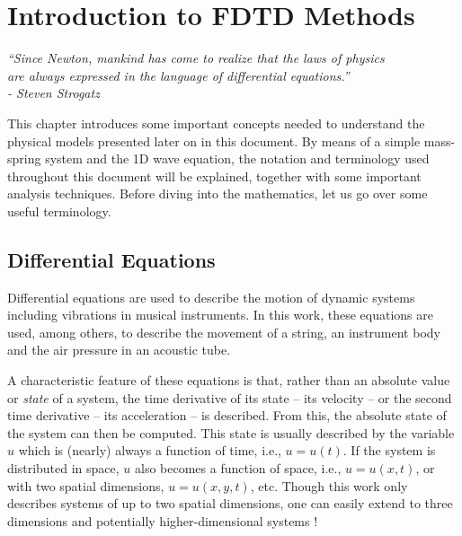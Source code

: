 \chapter{Introduction to FDTD Methods}\label{ch:FDTD}

\begin{flushright}{\it
``Since Newton, mankind has come to realize that the laws of physics\\
are always expressed in the language of differential equations.''\\
- Steven Strogatz} %
\end{flushright}
%
\vspace{2em}
This chapter introduces some important concepts needed to understand the physical models presented later on in this document. 
By means of a simple mass-spring system and the 1D wave equation, the notation and terminology used throughout this document will be explained, together with some important analysis techniques. 
Before diving into the mathematics, let us go over some useful terminology.

\section{Differential Equations}
Differential equations are used to describe the motion of dynamic systems including vibrations in musical instruments. In this work, these equations are used, among others, to describe the movement of a string, an instrument body and the air pressure in an acoustic tube.

A characteristic feature of these equations is that, rather than an absolute value or \textit{state} of a system, the time derivative of its state -- its velocity -- or the second time derivative -- its acceleration -- is described. From this, the absolute state of the system can then be computed.
%
This state is usually described by the variable $u$ which is (nearly) always a function of time, i.e., $u=u(t)$. If the system is distributed in space, $u$ also becomes a function of space, i.e., $u = u(x,t)$, or with two spatial dimensions, $u = u(x,y,t)$, etc. Though this work only describes systems of up to two spatial dimensions, one can easily extend to three dimensions \cite{Hamilton2016} and potentially higher-dimensional systems \cite{Bustamante2017}! 

